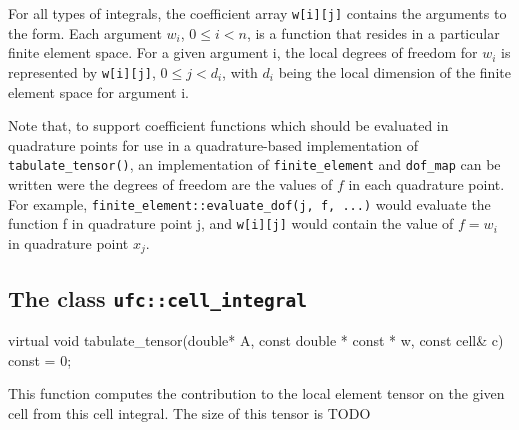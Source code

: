 For all types of integrals, the coefficient array \texttt{w[i][j]} contains the
arguments to the form. Each argument $w_i$, $0\le i<n$, is a function that resides in a 
particular finite element space. For a given argument i, the local degrees of freedom for $w_i$
is represented by \texttt{w[i][j]}, $0 \le j < d_i$, with $d_i$ being the local dimension of
the finite element space for argument i.

Note that, to support coefficient functions which should be evaluated in quadrature points
for use in a quadrature-based implementation of \texttt{tabulate\_tensor()},
an implementation of \texttt{finite\_element} and \texttt{dof\_map}
can be written were the degrees of freedom are the values of $f$ in each
quadrature point. For example, \texttt{finite\_element::evaluate\_dof(j, f, ...)}
would evaluate the function f in quadrature point j, and \texttt{w[i][j]} would contain
the value of $f=w_i$ in quadrature point $x_j$.












\subsection{The class \texttt{ufc::cell\_integral}}
\begin{code}
virtual void tabulate_tensor(double* A,
                             const double * const * w,
                             const cell& c) const = 0;
\end{code}
This function computes the contribution to the local element tensor
on the given cell from this cell integral.
The size of this tensor is TODO


